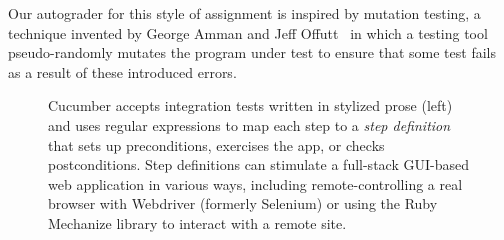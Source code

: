 Our autograder for this
style of assignment is inspired by mutation testing, a technique invented
by George Amman and Jeff 
Offutt~\cite{ammann-offutt-sw-testing} in which a
testing tool pseudo-randomly mutates the program under test to ensure
that some test fails as a result of these introduced errors.



\begin{figure}
  \begin{minipage}{0.45\textwidth}%
  \end{minipage}%
  \begin{minipage}{0.5\textwidth}%
  \end{minipage}%
  \caption{\label{fig:cucumber} Cucumber accepts integration tests 
    written in stylized prose (left) and uses regular expressions to map each
    step to a \emph{step definition} that sets up preconditions, exercises the app,
    or checks postconditions.  Step definitions 
    can stimulate a full-stack GUI-based web application in various
    ways, including remote-controlling a real browser with Webdriver
    (formerly Selenium) or using the Ruby Mechanize library to interact
    with a remote site.}
\end{figure}



